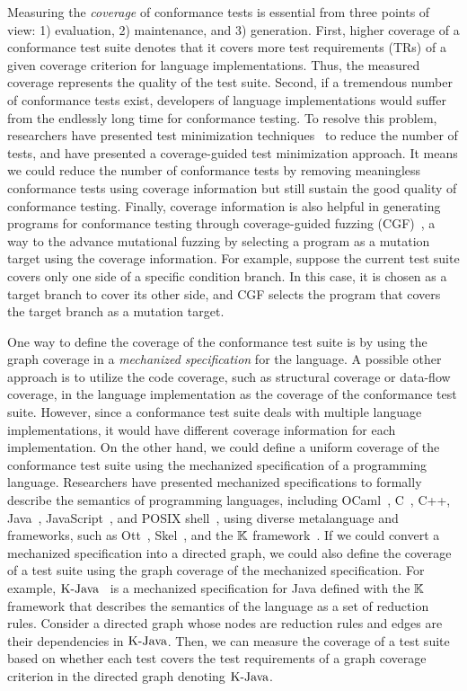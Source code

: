 Measuring the \textit{coverage} of conformance tests is essential from three
points of view: 1) evaluation, 2) maintenance, and 3) generation.
%
First, higher coverage of a conformance test suite denotes that it covers more
test requirements (TRs) of a given coverage criterion for language
implementations.
%
Thus, the measured coverage represents the quality of the test suite.
%
Second, if a tremendous number of conformance tests exist, developers of
language implementations would suffer from the endlessly long time for
conformance testing.
%
To resolve this problem, researchers have presented test minimization
techniques~\cite{test-minimize-survey} to reduce the number of tests, and
\citet{cov-test-minimize} have presented a coverage-guided test minimization
approach.
%
It means we could reduce the number of conformance tests by removing meaningless
conformance tests using coverage information but still sustain the good quality
of conformance testing.
%
Finally, coverage information is also helpful in generating programs for
conformance testing through coverage-guided fuzzing (CGF)~\cite{afl}, a way to
the advance mutational fuzzing by selecting a program as a mutation target using
the coverage information.
%
For example, suppose the current test suite covers only one side of a specific
condition branch.
%
In this case, it is chosen as a target branch to cover its other side, and CGF
selects the program that covers the target branch as a mutation target.


One way to define the coverage of the conformance test suite is by using the
graph coverage in a \textit{mechanized specification} for the language.
%
A possible other approach is to utilize the code coverage, such as structural
coverage or data-flow coverage, in the language implementation as the coverage
of the conformance test suite.
%
However, since a conformance test suite deals with multiple language
implementations, it would have different coverage information for each
implementation.
%
On the other hand, we could define a uniform coverage of the conformance test
suite using the mechanized specification of a programming language.
%
Researchers have presented mechanized specifications to formally describe the
semantics of programming languages, including OCaml~\cite{ocaml-light-spec},
C~\cite{c-light-spec}, C++\cite{cpp-spec}, Java~\cite{k-java},
JavaScript~\cite{jiset}, and POSIX shell~\cite{posix-shell-spec}, using diverse
metalanguage and frameworks, such as Ott~\cite{ott}, Skel~\cite{skel}, and the
$\mathbb{K}$ framework~\cite{kframework}.
%
If we could convert a mechanized specification into a directed graph, we could
also define the coverage of a test suite using the graph coverage of the
mechanized specification.
%
For example, $\text{K-Java}$~\cite{k-java} is a mechanized specification for Java
defined with the $\mathbb{K}$ framework that describes the semantics of the
language as a set of reduction rules.
%
Consider a directed graph whose nodes are reduction rules and edges are
their dependencies in $\text{K-Java}$.
%
Then, we can measure the coverage of a test suite based on whether each test
covers the test requirements of a graph coverage criterion in the directed graph
denoting $\text{K-Java}$.

